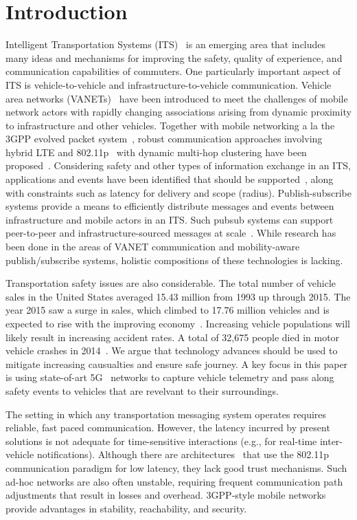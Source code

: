 \section{Introduction}

Intelligent Transportation Systems (ITS)~\cite{zhang2011data} is an emerging
area that includes many ideas and mechanisms for improving the safety,
quality of experience, and communication capabilities of
commuters. One particularly important aspect of ITS is
vehicle-to-vehicle and infrastructure-to-vehicle
communication. Vehicle area networks (VANETs)~\cite{hartenstein2008tutorial} have been
introduced to meet the challenges of mobile network actors with
rapidly changing associations arising from dynamic proximity to
infrastructure and other vehicles. Together with mobile networking a
la the 3GPP evolved packet system~\cite{4G}, robust communication
approaches involving hybrid LTE and 802.11p~\cite{802.11p} with
dynamic multi-hop clustering have been
proposed~\cite{ucar2016multihop,wolny2008modified,zhang2011novel}.
Considering safety and
other types of information exchange in an ITS, applications and events
have been identified that should be supported~\cite{camp2005vehicle,papadimitratos2009vehicular}, along
with constraints such as latency for delivery and scope
(radius). Publish-subscribe systems provide a means to efficiently
distribute messages and events between infrastructure and mobile
actors in an ITS. Such pubsub systems can support peer-to-peer and
infrastructure-sourced messages at scale~\cite{nasim2014mobile}.  While
research has been done in the areas of VANET communication and
mobility-aware publish/subscribe systems, holistic compositions of
these technologies is lacking.

Transportation safety issues are also considerable.  The total number
of vehicle sales in the United States averaged 15.43 million from 1993
up through 2015. The year 2015 saw a surge in sales, which climbed to
17.76 million vehicles and is expected to rise with the improving
economy~\cite{te}. Increasing vehicle populations will likely result
in increasing accident rates. A total of 32,675 people died in motor
vehicle crashes in 2014~\cite{iihs}. We argue that technology advances
should be used to mitigate increasing causualties and ensure safe
journey. A key focus in this paper is using state-of-art
5G~\cite{5gvision} networks to capture vehicle telemetry and pass
along safety events to vehicles that are revelvant to their
surroundings.

The setting in which any transportation messaging system operates
requires reliable, fast paced communication. However, the latency
incurred by present solutions is not adequate for time-sensitive
interactions (e.g., for real-time inter-vehicle
notifications). Although there are architectures~\cite{mh} that use
the 802.11p communication paradigm for low latency, they lack good
trust mechanisms. Such ad-hoc networks are also often unstable,
requiring frequent communication path adjustments that result in
losses and overhead. 3GPP-style mobile networks provide advantages in
stability, reachability, and security.

